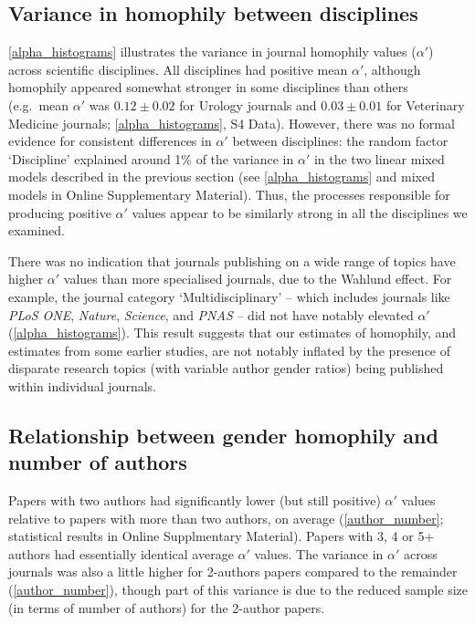 \documentclass[12pt,]{article}
\begin{document}
\subsection{Variance in homophily between
disciplines}\label{variance-in-homophily-between-disciplines}

\autoref{alpha_histograms} illustrates the variance in journal homophily
values (\(\alpha'\)) across scientific disciplines. All disciplines had
positive mean \(\alpha'\), although homophily appeared somewhat stronger
in some disciplines than others (e.g.~mean \(\alpha'\) was
\(0.12{\pm}0.02\) for Urology journals and \(0.03{\pm}0.01\) for
Veterinary Medicine journals; \autoref{alpha_histograms}, S4 Data).
However, there was no formal evidence for consistent differences in
\(\alpha'\) between disciplines: the random factor `Discipline'
explained around 1\% of the variance in \(\alpha'\) in the two linear
mixed models described in the previous section (see
\autoref{alpha_histograms} and mixed models in Online Supplementary
Material). Thus, the processes responsible for producing positive
\(\alpha'\) values appear to be similarly strong in all the disciplines
we examined.

There was no indication that journals publishing on a wide range of
topics have higher \(\alpha'\) values than more specialised journals,
due to the Wahlund effect. For example, the journal category
`Multidisciplinary' -- which includes journals like \emph{PLoS ONE},
\emph{Nature}, \emph{Science}, and \emph{PNAS} -- did not have notably
elevated \(\alpha'\) (\autoref{alpha_histograms}). This result suggests
that our estimates of homophily, and estimates from some earlier
studies, are not notably inflated by the presence of disparate research
topics (with variable author gender ratios) being published within
individual journals.

\subsection{Relationship between gender homophily and number of
authors}\label{relationship-between-gender-homophily-and-number-of-authors}

Papers with two authors had significantly lower (but still positive)
\(\alpha'\) values relative to papers with more than two authors, on
average (\autoref{author_number}; statistical results in Online
Supplmentary Material). Papers with 3, 4 or 5+ authors had essentially
identical average \(\alpha'\) values. The variance in \(\alpha'\) across
journals was also a little higher for 2-authors papers compared to the
remainder (\autoref{author_number}), though part of this variance is due
to the reduced sample size (in terms of number of authors) for the
2-author papers.
\end{document}
